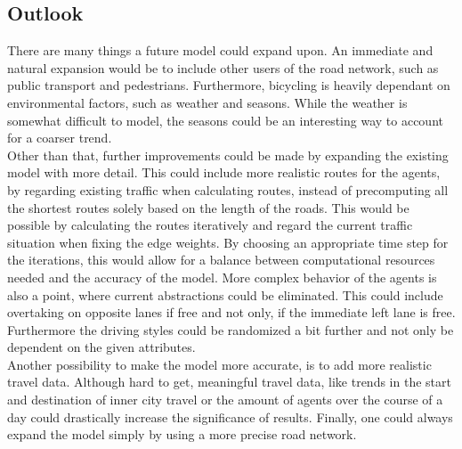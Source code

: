 \subsection{Outlook}
There are many things a future model could expand upon. An immediate and natural expansion would be to include other users of the road network, such as public transport and pedestrians. Furthermore, bicycling is heavily dependant on environmental factors, such as weather and seasons. While the weather is somewhat difficult to model, the seasons could be an interesting way to account for a coarser trend. \\
Other than that, further improvements could be made by expanding the existing model with more detail. This could include more realistic routes for the agents, by regarding existing traffic when calculating routes, instead of precomputing all the shortest routes solely based on the length of the roads. This would be possible by calculating the routes iteratively and regard the current traffic situation when fixing the edge weights. By choosing an appropriate time step for the iterations, this would allow for a balance between computational resources needed and the accuracy of the model. More complex behavior of the agents is also a point, where current abstractions could be eliminated. This could include overtaking on opposite lanes if free and not only, if the immediate left lane is free. Furthermore the driving styles could be randomized a bit further and not only be dependent on the given attributes.\\
Another possibility to make the model more accurate, is to add more realistic travel data. Although hard to get, meaningful travel data, like trends in the start and destination of inner city travel or the amount of agents over the course of a day could drastically increase the significance of results.  Finally, one could always expand the model simply by using a more precise road network. 
